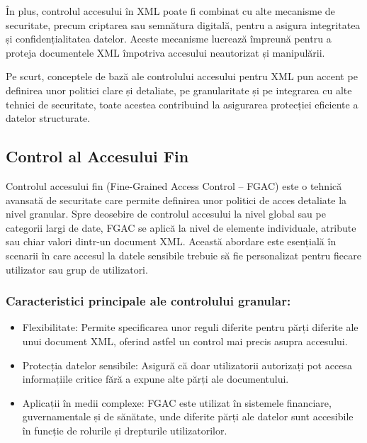 \documentclass[runningheads]{llncs}
\begin{document}
\begin{spacing}{1.5}
În plus, controlul accesului în XML poate fi combinat cu alte mecanisme de securitate, precum criptarea sau semnătura digitală, pentru a asigura integritatea și confidențialitatea datelor. Aceste mecanisme lucrează împreună pentru a proteja documentele XML împotriva accesului neautorizat și manipulării.

Pe scurt, conceptele de bază ale controlului accesului pentru XML pun accent pe definirea unor politici clare și detaliate, pe granularitate și pe integrarea cu alte tehnici de securitate, toate acestea contribuind la asigurarea protecției eficiente a datelor structurate.



\subsection{Control al Accesului Fin}

Controlul accesului fin (Fine-Grained Access Control – FGAC) este o tehnică avansată de securitate care permite definirea unor politici de acces detaliate la nivel granular. Spre deosebire de controlul accesului la nivel global sau pe categorii largi de date, FGAC se aplică la nivel de elemente individuale, atribute sau chiar valori dintr-un document XML. Această abordare este esențială în scenarii în care accesul la datele sensibile trebuie să fie personalizat pentru fiecare utilizator sau grup de utilizatori.

\subsubsection{Caracteristici principale ale controlului granular:}

\begin{itemize}

    \item Flexibilitate: Permite specificarea unor reguli diferite pentru părți diferite ale unui document XML, oferind astfel un control mai precis asupra accesului.
    
    \item Protecția datelor sensibile: Asigură că doar utilizatorii autorizați pot accesa informațiile critice fără a expune alte părți ale documentului.
    
    \item Aplicații în medii complexe: FGAC este utilizat în sistemele financiare, guvernamentale și de sănătate, unde diferite părți ale datelor sunt accesibile în funcție de rolurile și drepturile utilizatorilor.
    

\end{itemize}
\end{spacing}
\end{document}
